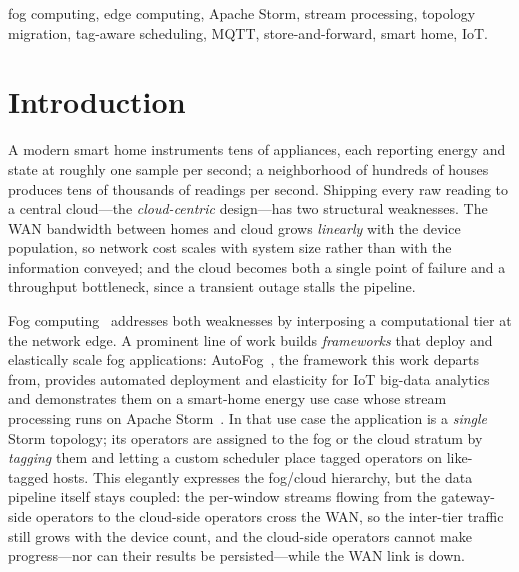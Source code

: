 \documentclass[conference]{IEEEtran}
\newcommand{\msgps}{\,\text{msg/s}}
\newcommand{\code}[1]{\texttt{#1}}
\begin{document}
\begin{abstract}
$\sim$\SI{11}{} million tuples and drives the \code{avg-1} bolt to a Storm
capacity of \textbf{14.5} ($14.5\times$ over a sustainable executor), confirming a
severe central bottleneck. The migration eliminates it: holding total load fixed
at \SI{400}{\msgps}, the fog tier cuts the cloud's emitted/transferred tuples and
WAN traffic by \SI{92}{}--\SI{93}{\percent} independent of house count;
distributing the load across eight gateways lowers cloud complete latency from
\SI{77006}{\milli\second} to \SI{2439}{\milli\second} ($31.6\times$) relative to a
single gateway; and store-and-forward yields \SI{0}{\percent} data loss across a
\SI{300}{\second} cloud outage, with the edge never interrupted. We close with
three implementation limits found by code inspection.
\end{abstract}

\begin{IEEEkeywords}
fog computing, edge computing, Apache Storm, stream processing, topology
migration, tag-aware scheduling, MQTT, store-and-forward, smart home, IoT.
\end{IEEEkeywords}

\section{Introduction}\label{sec:intro}
A modern smart home instruments tens of appliances, each reporting energy and
state at roughly one sample per second; a neighborhood of hundreds of houses
produces tens of thousands of readings per second. Shipping every raw reading to
a central cloud---the \emph{cloud-centric} design---has two structural
weaknesses. The WAN bandwidth between homes and cloud grows \emph{linearly} with
the device population, so network cost scales with system size rather than with
the information conveyed; and the cloud becomes both a single point of failure
and a throughput bottleneck, since a transient outage stalls the pipeline.

Fog computing~\cite{bonomi2012,bonomi2014,satyanarayanan2017,shi2016} addresses
both weaknesses by interposing a computational tier at the network edge. A
prominent line of work builds \emph{frameworks} that deploy and elastically scale
fog applications: AutoFog~\cite{pham2021}, the framework this work departs from,
provides automated deployment and elasticity for IoT big-data analytics and
demonstrates them on a smart-home energy use case whose stream processing runs on
Apache Storm~\cite{stormtwitter}. In that use case the application is a
\emph{single} Storm topology; its operators are assigned to the fog or the cloud
stratum by \emph{tagging} them and letting a custom scheduler place tagged
operators on like-tagged hosts. This elegantly expresses the fog/cloud hierarchy,
but the data pipeline itself stays coupled: the per-window streams flowing from
the gateway-side operators to the cloud-side operators cross the WAN, so the
inter-tier traffic still grows with the device count, and the cloud-side
operators cannot make progress---nor can their results be persisted---while the
WAN link is down.
\end{document}
